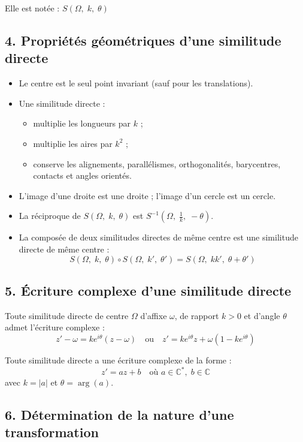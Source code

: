 Elle est notée : $S(\Omega,\;k,\;\theta)$

\subsection*{4. Propriétés géométriques d'une similitude directe}

\begin{itemize}
  \item Le centre est le seul point invariant (sauf pour les translations).
  \item Une similitude directe :
    \begin{itemize}
      \item multiplie les longueurs par $k$ ;
      \item multiplie les aires par $k^2$ ;
      \item conserve les alignements, parallélismes, orthogonalités, barycentres, contacts et angles orientés.
    \end{itemize}
  \item L'image d'une droite est une droite ; l'image d’un cercle est un cercle.
  \item La réciproque de $S(\Omega,\;k,\;\theta)$ est $S^{-1}(\Omega,\;\tfrac{1}{k},\;-\theta)$.
  \item La composée de deux similitudes directes de même centre est une similitude directe de même centre :
  \[
  S(\Omega,\;k,\;\theta)\circ S(\Omega,\;k',\;\theta') = S(\Omega,\;kk',\;\theta+\theta')
  \]
\end{itemize}

\subsection*{5. Écriture complexe d'une similitude directe}

Toute similitude directe de centre $\Omega$ d'affixe $\omega$, de rapport $k > 0$ et d'angle $\theta$ admet l’écriture complexe :
\[
z' - \omega = k e^{i\theta}(z - \omega) \quad \text{ou} \quad z' = k e^{i\theta}z + \omega(1 - k e^{i\theta})
\]

\begin{corollary}
Toute similitude directe a une écriture complexe de la forme :
\[
z' = az + b \quad \text{où } a \in \mathbb{C}^*,\; b \in \mathbb{C}
\]
avec $k = |a|$ et $\theta = \arg(a)$.
\end{corollary}

\subsection*{6. Détermination de la nature d’une transformation}

